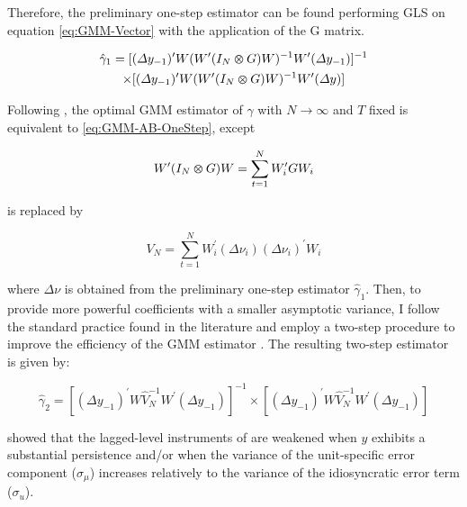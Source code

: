 \documentclass[a4paper, 12pt]{article}
\begin{document}
Therefore, the \citet{arellano1991some} preliminary one-step estimator can be found performing GLS on equation \eqref{eq:GMM-Vector} with the application of the G matrix.

\begin{multline} \label{eq:GMM-AB-OneStep}
\hat{\gamma}_1 = [(\Delta y_{-1})^{\prime} W(W^{\prime}(I_N \varotimes G)W)^{-1}W^{\prime}(\Delta y_{-1})]^{-1} \\ \times [(\Delta y_{-1})^{\prime} W(W^{\prime}(I_N \varotimes G)W)^{-1}W^{\prime}(\Delta y)]
\end{multline}


Following \citet{hansen1982large}, the optimal GMM estimator of $\gamma$ with ${N\to\infty}$ and $T$ fixed is equivalent to \eqref{eq:GMM-AB-OneStep}, except

\begin{equation} \label{eq:GMM-AB-Hansen}
W^{\prime}(I_N \varotimes G)W = \sum_{t=1}^N W_i^{\prime} GW_i
\end{equation}


is replaced by  

\begin{equation} \label{eq:GMM-AB-HansenRep}
V_N = \sum_{t=1}^N W_i^{\prime}(\Delta \nu_i)(\Delta \nu_i)^{\prime}W_i
\end{equation}

where $\Delta \nu$ is obtained from the preliminary one-step estimator $\hat{\gamma}_1$. Then, to provide more powerful coefficients with a smaller asymptotic variance, I follow the standard practice found in the literature and employ a two-step procedure to improve the efficiency of the GMM estimator \citep{hwang2018should}. The resulting two-step \citet{arellano1991some} estimator is given by:


\begin{equation} \label{eq:GMM-AB-TwoStep}
\hat{\gamma}_2 = [(\Delta y_{-1})^{\prime} W\hat{V}_N^{-1}W^{\prime}(\Delta y_{-1})]^{-1} \times [(\Delta y_{-1})^{\prime} W\hat{V}_N^{-1}W^{\prime}(\Delta y_{-1})]
\end{equation}




\citet{blundell1998initial} showed that the lagged-level instruments of \citet{arellano1991some} are weakened when $y$ exhibits a substantial persistence and/or when the variance of the unit-specific error component ($\sigma_{\mu}$) increases relatively to the variance of the idiosyncratic error term ($\sigma_{u}$). 


\end{document}

